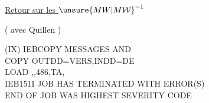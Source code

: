 \uline{Retour sur les $\unsure{MW|M\mathcal W}^{-1}$}

( avec Quillen )

(IX)
{\ttfamily IEBCOPY MESSAGES AND \\
COPY OUTDD=VERS,INDD=DE\\
  LOAD \unsure{-}  ,,486,TA,\\
IEB151I JOB HAS TERMINATED WITH ERROR(S)\\
 END OF JOB WAS HIGHEST SEVERITY CODE}

